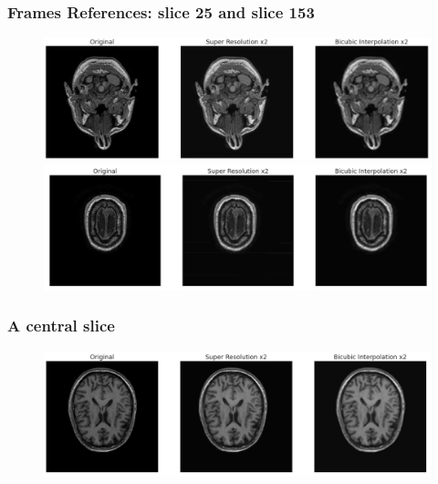 \documentclass{beamer}
\begin{document}
\begin{frame}
  \frametitle{Frames References: slice 25 and slice 153}
    \begin{figure}
  \includegraphics[scale=0.29]{images/ref_case01015_t1_2lr_025_000.png}
  \includegraphics[scale=0.29]{images/ref_case01015_t1_2lr_153_000.png}
 \end{figure}
\end{frame}

\begin{frame}
 \frametitle{A central slice}
 \begin{figure}
  \includegraphics[scale=0.29]{images/ref_case01015_t1_2lr_100_000.png}
 \end{figure}
\end{frame}
\end{document}
